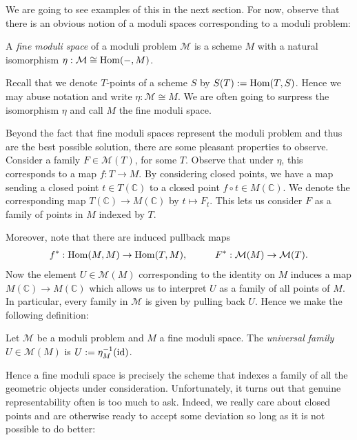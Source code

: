 \documentclass[12pt]{ociamthesis}  %
\begin{document}
We are going to see examples of this in the next section. For now, 
observe that there is an obvious notion of a moduli spaces
corresponding to a moduli problem:

\begin{definition}
  A \emph{fine moduli space} of a moduli problem $\mathcal M$
  is a scheme $M$ with a natural isomorphism
  $\eta : \mathcal M \cong \operatorname{Hom}(-,M)$.
\end{definition}

Recall that we denote $T$-points of a scheme $S$ by
$S(T) := \operatorname{Hom}(T,S)$. Hence we may abuse notation and write
$\eta : \mathcal M \cong M$. We are often going to surpress the
isomorphism $\eta$ and call $M$ the fine moduli space.

Beyond the fact that fine moduli spaces represent the moduli
problem and thus are the best possible solution, there are some
pleasant properties to observe.
Consider a family $F\in\mathcal M(T)$, for some $T$. Observe that
under $\eta$, this corresponds to a map $f:T\to M$. By considering
closed points, we have a map sending a closed point $t\in T(\mathbb C)$
to a closed point $f\circ t\in M(\mathbb C)$. We denote the corresponding
map $T(\mathbb C)\to M(\mathbb C)$ by $t \mapsto F_t$. This lets us consider $F$ as a family of
points in $M$ indexed by $T$.

Moreover, note that there are induced
pullback maps
\begin{align*}
  f^* : \operatorname{Hom}(M,M)\to\operatorname{Hom}(T,M), \hspace{1cm}
  F^* : \mathcal M(M)\to \mathcal M(T).
\end{align*}
Now the element $U\in\mathcal M(M)$ corresponding to the identity on $M$
induces a map $M(\mathbb C)\to M(\mathbb C)$ which allows us to
interpret $U$ as a family of all points of $M$. In particular,
every family in $\mathcal M$ is given by pulling back $U$.
Hence we make the following definition:

\begin{definition}
  Let $\mathcal M$ be a moduli problem and $M$ a fine moduli space.
  The \emph{universal family} $U\in\mathcal M(M)$ is
  $U:=\eta^{-1}_M (\operatorname{id})$.
\end{definition}

Hence a fine moduli space is precisely the scheme that indexes
a family of all the geometric objects under consideration.
Unfortunately, it turns out that genuine representability often is
too much to ask. Indeed, we really care about closed points and are
otherwise ready to accept some deviation so long as it is not
possible to do better:
\end{document}
